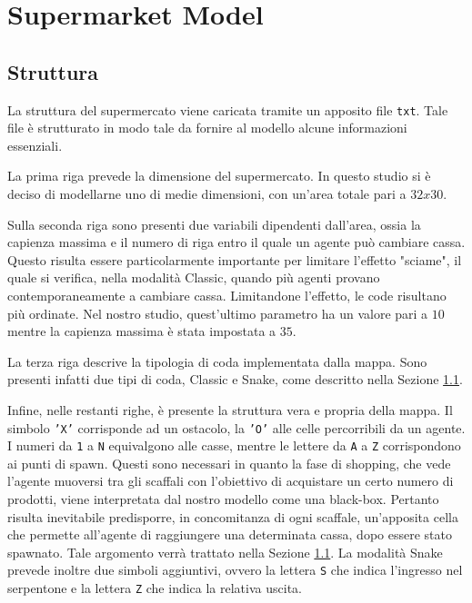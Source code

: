 \section{Supermarket Model}

\subsection{Struttura}
La struttura del supermercato viene caricata tramite un apposito file \lstinline{txt}. 
Tale file è strutturato in modo tale da fornire al modello alcune informazioni essenziali.

La prima riga prevede la dimensione del supermercato.
In questo studio si è deciso di modellarne uno di medie dimensioni, con un'area totale pari a $32x30$.

Sulla seconda riga sono presenti due variabili dipendenti dall'area, ossia la capienza massima e il numero di riga entro il quale un agente può cambiare cassa. 
Questo risulta essere particolarmente importante per limitare l'effetto "sciame", il quale si verifica, nella modalità Classic, quando più agenti provano contemporaneamente a cambiare cassa. Limitandone l'effetto, le code risultano più ordinate.
Nel nostro studio, quest'ultimo parametro ha un valore pari a $10$ mentre la capienza massima è stata impostata a $35$.

La terza riga descrive la tipologia di coda implementata dalla mappa. 
Sono presenti infatti due tipi di coda, Classic e Snake, come descritto nella Sezione \ref{}.

Infine, nelle restanti righe, è presente la struttura vera e propria della mappa. 
Il simbolo \texttt{'X'} corrisponde ad un ostacolo, la \texttt{'O'} alle celle percorribili da un agente. 
I numeri da \texttt{1} a \texttt{N} equivalgono alle casse, mentre le lettere da \texttt{A} a \texttt{Z} corrispondono ai punti di spawn. 
Questi sono necessari in quanto la fase di shopping, che vede l'agente muoversi tra gli scaffali con l'obiettivo di acquistare un certo numero di prodotti, viene interpretata dal nostro modello come una black-box. 
Pertanto risulta inevitabile predisporre, in concomitanza di ogni scaffale, un'apposita cella che permette all'agente di raggiungere una determinata cassa, dopo essere stato spawnato. 
Tale argomento verrà trattato nella Sezione \ref{}.
La modalità Snake prevede inoltre due simboli aggiuntivi, ovvero la lettera \texttt{S} che indica l'ingresso nel serpentone e la lettera \texttt{Z} che indica la relativa uscita. 

